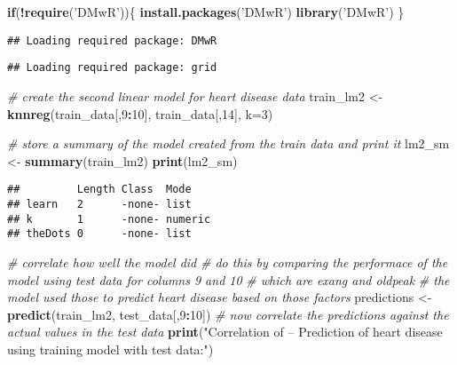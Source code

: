 \documentclass[]{article}
\newenvironment{Shaded}{\begin{snugshade}}{\end{snugshade}}
\newcommand{\KeywordTok}[1]{\textcolor[rgb]{0.13,0.29,0.53}{\textbf{#1}}}
\newcommand{\DataTypeTok}[1]{\textcolor[rgb]{0.13,0.29,0.53}{#1}}
\newcommand{\DecValTok}[1]{\textcolor[rgb]{0.00,0.00,0.81}{#1}}
\newcommand{\StringTok}[1]{\textcolor[rgb]{0.31,0.60,0.02}{#1}}
\newcommand{\CommentTok}[1]{\textcolor[rgb]{0.56,0.35,0.01}{\textit{#1}}}
\newcommand{\ControlFlowTok}[1]{\textcolor[rgb]{0.13,0.29,0.53}{\textbf{#1}}}
\newcommand{\OperatorTok}[1]{\textcolor[rgb]{0.81,0.36,0.00}{\textbf{#1}}}
\newcommand{\NormalTok}[1]{#1}
\begin{document}
\begin{Shaded}
\begin{Highlighting}[]
\ControlFlowTok{if}\NormalTok{(}\OperatorTok{!}\KeywordTok{require}\NormalTok{(}\StringTok{'DMwR'}\NormalTok{))\{}
  \KeywordTok{install.packages}\NormalTok{(}\StringTok{'DMwR'}\NormalTok{)  }
  \KeywordTok{library}\NormalTok{(}\StringTok{'DMwR'}\NormalTok{)}
\NormalTok{\}}
\end{Highlighting}
\end{Shaded}

\begin{verbatim}
## Loading required package: DMwR
\end{verbatim}

\begin{verbatim}
## Loading required package: grid
\end{verbatim}

\begin{Shaded}
\begin{Highlighting}[]
\CommentTok{# create the second linear model for heart disease data}
\NormalTok{train_lm2 <-}\StringTok{ }\KeywordTok{knnreg}\NormalTok{(train_data[,}\DecValTok{9}\OperatorTok{:}\DecValTok{10}\NormalTok{], train_data[,}\DecValTok{14}\NormalTok{], }\DataTypeTok{k=}\DecValTok{3}\NormalTok{)}

\CommentTok{# store a summary of the model created from the train data and print it}
\NormalTok{lm2_sm <-}\StringTok{ }\KeywordTok{summary}\NormalTok{(train_lm2)}
\KeywordTok{print}\NormalTok{(lm2_sm)}
\end{Highlighting}
\end{Shaded}

\begin{verbatim}
##         Length Class  Mode   
## learn   2      -none- list   
## k       1      -none- numeric
## theDots 0      -none- list
\end{verbatim}

\begin{Shaded}
\begin{Highlighting}[]
\CommentTok{# correlate how well the model did}
\CommentTok{# do this by comparing the performace of the model using test data for columns 9 and 10}
\CommentTok{# which are exang and oldpeak}
\CommentTok{# the model used those to predict heart disease based on those factors}
\NormalTok{predictions <-}\StringTok{ }\KeywordTok{predict}\NormalTok{(train_lm2, test_data[,}\DecValTok{9}\OperatorTok{:}\DecValTok{10}\NormalTok{])}
\CommentTok{# now correlate the predictions against the actual values in the test data}
\KeywordTok{print}\NormalTok{(}\StringTok{"Correlation of -- Prediction of heart disease using training model with test data:"}\NormalTok{)}
\end{Highlighting}
\end{Shaded}
\end{document}
